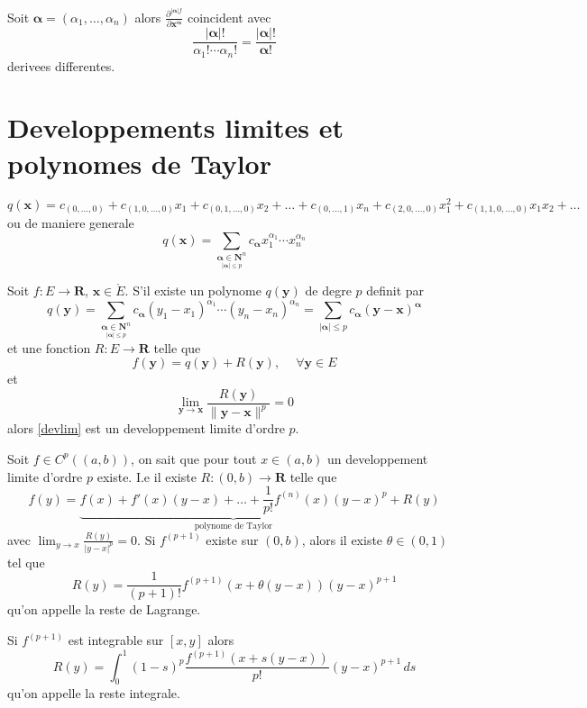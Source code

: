 Soit $\boldsymbol{\alpha}=(\alpha_{1},\dots,\alpha _{n})$ alors $\frac{ \partial^{|\boldsymbol{\alpha}|f} }{ \partial \boldsymbol{x}^{\boldsymbol{\alpha}} }$ coincident avec 
$$
\frac{|\boldsymbol{\alpha}|!}{\alpha_{1}!\cdots\alpha _{n}!}=\frac{|\boldsymbol{\alpha}|!}{\boldsymbol{\alpha}!}
$$
derivees differentes.

\section{Developpements limites et polynomes de Taylor}

\begin{definition}
$$
q(\boldsymbol{x})=c_{(0,\dots,0)}+c_{(1,0,\dots,0)}x_{1}+c_{(0,1,\dots,0)}x_{2}+\dots +c_{(0,\dots,1)}x_{n}+c_{(2,0,\dots,0)}x_{1}^{2}+c_{(1,1,0,\dots,0)}x_{1}x_{2}+\dots
$$
ou de maniere generale
$$
q(\boldsymbol{x})=\sum _{\underset{|\boldsymbol{\alpha}|\le p}{\boldsymbol{\alpha}\in \mathbf{N}^{n}}}c_{\boldsymbol{\alpha}}x_{1}^{\alpha_{1}}\cdots x_{n}^{\alpha _{n}}
$$
\end{definition}

\begin{definition}
Soit $f:E\to \mathbf{R}$, $\boldsymbol{x}\in \mathring{E}$. S'il existe un polynome $q(\boldsymbol{y})$ de degre $p$ definit par
$$
q(\boldsymbol{y})=\sum _{\underset{|\boldsymbol{\alpha}|\le p}{\boldsymbol{\alpha}\in \mathbf{N}^{n}}} c_{\boldsymbol{\alpha}}(y_{1}-x_{1})^{\alpha_{1}}\cdots(y_{n}-x_{n})^{\alpha _{n}}=\sum _{|\boldsymbol{\alpha}|\le p} c_{\boldsymbol{\alpha}}(\boldsymbol{y}-\boldsymbol{x})^{\boldsymbol{\alpha}}
$$
et une fonction $R:E\to \mathbf{R}$ telle que
\begin{equation}
f(\boldsymbol{y})=q(\boldsymbol{y})+R(\boldsymbol{y}),~\quad \forall \boldsymbol{y}\in E \label{devlim}
\end{equation}
et 
$$
\lim_{ \boldsymbol{y} \to \boldsymbol{x} } \frac{R(\boldsymbol{y})}{\lVert \boldsymbol{y}-\boldsymbol{x} \rVert^{p} }=0 
$$
alors \ref{devlim} est un developpement limite d'ordre $p$.
\end{definition}
\begin{reminder}
Soit $f\in C^{p}((a,b))$, on sait que pour tout $x \in(a,b)$ un developpement limite d'ordre $p$ existe. I.e il existe $R:(0,b)\to \mathbf{R}$ telle que
$$
f(y)=\underbrace{ f(x)+f'(x)(y-x)+\dots +\frac{1}{p!}f^{(n)}(x)(y-x)^{p} }_{ \text{polynome de Taylor} }+R(y)
$$
avec $\lim_{ y\to x}\frac{R(y)}{|y-x|^{p}}=0$. Si $f^{(p+1)}$ existe sur $(0,b)$, alors il existe $\theta \in(0,1)$ tel que 
$$
R(y)=\frac{1}{(p+1)!}f^{(p+1)}(x+\theta(y-x))(y-x)^{p+1}
$$
qu'on appelle la reste de Lagrange. 

Si $f^{(p+1)}$ est integrable sur $[x,y]$ alors 
$$
R(y)=\int_{0}^{1} (1-s)^{p} \frac{f^{(p+1)}(x+s(y-x))}{p!}(y-x)^{p+1} \, ds
$$
qu'on appelle la reste integrale.
\end{reminder}

